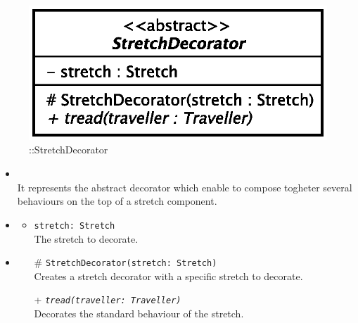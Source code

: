 \begin{figure}[h]
\centering
\includegraphics[scale=0.6,keepaspectratio]{images/solution/app/backend/stretch_decorator.eps}
\caption{\pReactiveComponentStretchDecoration::StretchDecorator}
\label{fig:sd-app-stretch_decorator}
\end{figure}
\FloatBarrier
\begin{itemize}
  \item \textbf{\descr} \\
    It represents the abstract decorator which enable to compose togheter several
behaviours on the top of a stretch component. 
  \item \textbf{\attrs}
  \begin{itemize}
    \item \texttt{stretch: Stretch} \\
The stretch to decorate.
  \end{itemize}
  \item \textbf{\ops}
   \begin{itemize} 
   \item[\#] \texttt{StretchDecorator(stretch: Stretch)} \\
Creates a stretch decorator with a specific stretch to decorate.
    \item[+] \texttt{\textit{tread(traveller: Traveller)}} \\
Decorates the standard behaviour of the stretch.  
  \end{itemize}
\end{itemize}

